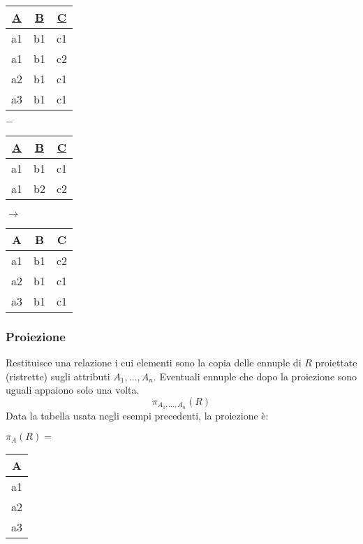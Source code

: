 \begin{table}[!h]
	\centering
	\begin{tabular}{|c|c|c|}
		\hline
		\textbf{\underline{A}} & \textbf{\underline{B}} & \textbf{\underline{C}} \\
		\hline
		a1 & b1 & c1 \\
		\hline
		a1 & b1 & c2 \\
		\hline
		a2 & b1 & c1 \\
		\hline
		a3 & b1 & c1 \\
		\hline
	\end{tabular}
	\hspace{10pt} $-$ \hspace{10pt}
	\begin{tabular}{|c|c|c|}
		\hline
		\textbf{\underline{A}} & \textbf{\underline{B}} & \textbf{\underline{C}} \\
		\hline
		a1 & b1 & c1 \\
		\hline
		a1 & b2 & c2 \\
		\hline
	\end{tabular}
	\hspace{10pt} $\longrightarrow$ \hspace{10pt}
	\begin{tabular}{|c|c|c|}
		\hline
		\textbf{A} & \textbf{B} & \textbf{C} \\
		\hline
		a1 & b1 & c2 \\
		\hline
		a2 & b1 & c1 \\
		\hline
		a3 & b1 & c1 \\
		\hline
	\end{tabular}
\end{table}

\newpage
\subsubsection{Proiezione}
Restituisce una relazione i cui elementi sono la copia delle ennuple di $R$ proiettate (ristrette) sugli attributi $A_1,\ldots, A_n$. Eventuali ennuple che dopo la proiezione sono uguali appaiono solo una volta.
\begin{equation}
	\pi_{A_1, \ldots, A_n} (R)
\end{equation}
Data la tabella usata negli esempi precedenti, la proiezione è:
\begin{table}[!h]
	\centering
	$\pi_A(R)=$ \hspace{10pt}
	\begin{tabular}{|c|}
		\hline
		\textbf{A} \\ 
		\hline
		a1 \\
		\hline
		a2 \\
		\hline
		a3\\
		\hline
	\end{tabular}
\end{table}
